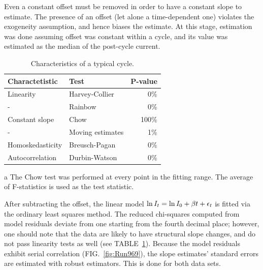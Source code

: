\documentclass[reprint, superscriptaddress]{revtex4-1}
\begin{document}
Even a constant offset must be removed in order to have a constant slope to estimate. The presence of an offset (let alone a time-dependent one) violates the exogeneity assumption, and hence biases the estimate. At this stage, estimation was done assuming offset was constant within a cycle, and its value was estimated as the median of the post-cycle current.

\begin{table}
\centering
\begin{threeparttable}
	\caption{Characteristics of a typical cycle.\label{tbl:CycleChars}}
	\begin{tabular}{llr}
	\hline\hline
	Charactetistic	& Test 					& P-value\\
	\hline
	Linearity 		& Harvey-Collier		& 0\% \\
	-				& Rainbow				& 0\% \\
	Constant slope	& Chow\tnote{a}		 	& 100\% \\
	-				& Moving estimates		& 1\% \\
	Homoskedasticity& Breusch-Pagan 		& 0\% \\
	Autocorrelation & Durbin-Watson			& 0\% \\
	\hline\hline
	\end{tabular}
	\begin{tablenotes}
		\item[a]{The Chow test was performed at every point in the fitting range. The average of F-statistics is used as the test statistic.}
	\end{tablenotes}
\end{threeparttable}
\end{table}

After subtracting the offset, the linear model $\ln I_t = \ln I_0 + \slp t +\epsilon_t$ is fitted via the ordinary least squares method. The reduced chi-squares computed from model residuals deviate from one starting from the fourth decimal place; however, one should note that the data are likely to have structural slope changes, and do not pass linearity tests as well (see TABLE~\ref{tbl:CycleChars}). Because the model residuals exhibit serial correlation (FIG.~\ref{fig:Run969}), the slope estimates' standard errors are estimated with robust estimators. This is done for both data sets.
\end{document}
